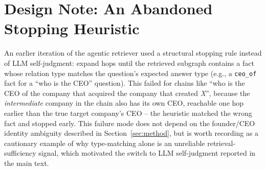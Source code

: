 \documentclass[11pt]{article}
\begin{document}
\appendix
\section{Design Note: An Abandoned Stopping Heuristic}
\label{sec:appendix-design}

An earlier iteration of the agentic retriever used a structural stopping rule instead of LLM self-judgment: expand hops until the retrieved subgraph contains a fact whose relation type matches the question's expected answer type (e.g., a \texttt{ceo\_of} fact for a ``who is the CEO'' question). This failed for chains like ``who is the CEO of the company that acquired the company that created \emph{X}'', because the \emph{intermediate} company in the chain also has its own CEO, reachable one hop earlier than the true target company's CEO -- the heuristic matched the wrong fact and stopped early. This failure mode does not depend on the founder/CEO identity ambiguity described in Section~\ref{sec:method}, but is worth recording as a cautionary example of why type-matching alone is an unreliable retrieval-sufficiency signal, which motivated the switch to LLM self-judgment reported in the main text.
\end{document}
